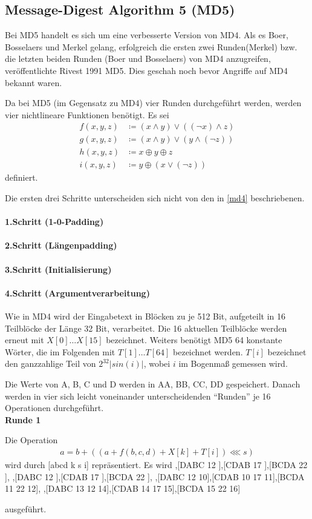 \documentclass[12pt,a4paper]{scrartcl}
\newcommand{\spar}{\par\vspace{10pt}\noindent}
\numberwithin{equation}{section}
\numberwithin{myalgctr}{section}
\numberwithin{mytheoremctr}{section}
\newcommand{\mpar}[1]{\paragraph*{#1}\mbox{}\par}
\begin{document}
	\subsection{Message-Digest Algorithm 5 (MD5)}
	Bei MD5 handelt es sich um eine verbesserte Version von MD4. Als es Boer, Bosselaers und Merkel gelang, erfolgreich die ersten zwei Runden(Merkel) bzw. die letzten beiden Runden (Boer und Bosselaers) von MD4 anzugreifen, veröffentlichte Rivest 1991 MD5. Dies geschah noch bevor Angriffe auf MD4 bekannt waren.\autocite[vgl.][498]{angewandteKryptographie}\par\noindent
	Da bei MD5 (im Gegensatz zu MD4) vier Runden durchgeführt werden, werden vier nichtlineare Funktionen benötigt. Es sei
	\begin{align}
		f(x, y, z) &\coloneqq (x\wedge y)\vee ((\neg x)\wedge z)\\
		g(x, y, z) &\coloneqq (x\wedge y)\vee (y\wedge (\neg z))\label{g-md5}\\ 
		h(x, y, z) &\coloneqq x\oplus y\oplus z\\
		i(x, y, z) &\coloneqq y\oplus (x\vee (\neg z))
	\end{align}
	definiert.\par\noindent
	Die ersten drei Schritte unterscheiden sich nicht von den in \cref{md4} beschriebenen.
	\mpar{1.Schritt (1-0-Padding)}
	\mpar{2.Schritt (Längenpadding)}
	\mpar{3.Schritt (Initialisierung)}	
	\mpar{4.Schritt (Argumentverarbeitung)}\noindent
	Wie in MD4 wird der Eingabetext in Blöcken zu je 512 Bit, aufgeteilt in 16 Teilblöcke der Länge 32 Bit, verarbeitet. Die 16 aktuellen Teilblöcke werden erneut mit $X[0]\dots X[15]$ bezeichnet.
	Weiters benötigt MD5 64 konstante Wörter, die im Folgenden mit $T[1]\dots T[64]$ bezeichnet werden. $T[i]$ bezeichnet den ganzzahlige Teil von $2^{32}|sin(i)|$, wobei $i$ im Bogenmaß gemessen wird.  
	\par\noindent
	Die Werte von A, B, C und D werden in AA, BB, CC, DD gespeichert. Danach werden in vier sich leicht voneinander unterscheidenden \textquotedblleft Runden\textquotedblright{} je 16 Operationen durchgeführt. \autocite[vgl.][4]{rivest}\\
	
	\noindent \textbf{Runde 1}\par\noindent
	Die Operation 
	\begin{align*}
	a = b+ ((a + f(b,c,d) + X[k] + T[i])\lll s)
	\end{align*}
	wird durch [abcd k s i] repräsentiert. Es wird
	\vspace{.5cm}
	\newline
	[ABCD \:\:0 7 \:\:1],\hfill [DABC \: 12 \:],\hfill [CDAB \: 17 \:],\hfill [BCDA \: 22 \:],
	\newline
	[ABCD \:\:4 7 \:\:5],\hfill [DABC \: 12 \:],\hfill [CDAB \: 17 \:],\hfill [BCDA \: 22 \:],
	\newline
	[ABCD \:\:8 7 \:\:9],\hfill [DABC \: 12 10],\hfill [CDAB 10 17 11],\hfill [BCDA 11 22 12],
	\newline
	[ABCD 12 7 13],\hfill [DABC 13 12 14],\hfill [CDAB 14 17 15],\hfill [BCDA 15 22 16]\:
	\spar
	ausgeführt.\\
	\vspace{.5cm}
	
\end{document}
